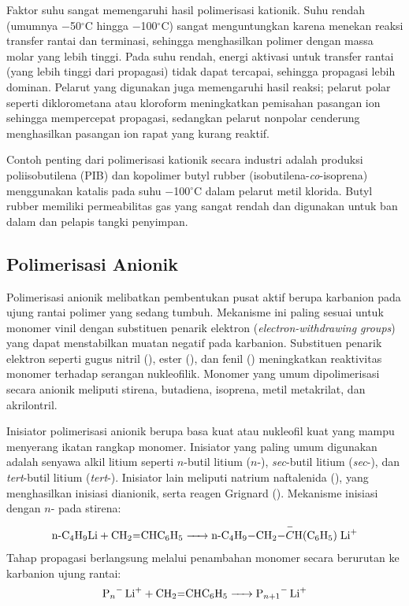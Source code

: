 \documentclass[12pt,a4paper,openany]{book}
\begin{document}
Faktor suhu sangat memengaruhi hasil polimerisasi kationik. Suhu rendah (umumnya $-$50$^\circ$C hingga $-$100$^\circ$C) sangat menguntungkan karena menekan reaksi transfer rantai dan terminasi, sehingga menghasilkan polimer dengan massa molar yang lebih tinggi. Pada suhu rendah, energi aktivasi untuk transfer rantai (yang lebih tinggi dari propagasi) tidak dapat tercapai, sehingga propagasi lebih dominan. Pelarut yang digunakan juga memengaruhi hasil reaksi; pelarut polar seperti diklorometana atau kloroform meningkatkan pemisahan pasangan ion sehingga mempercepat propagasi, sedangkan pelarut nonpolar cenderung menghasilkan pasangan ion rapat yang kurang reaktif.

Contoh penting dari polimerisasi kationik secara industri adalah produksi poliisobutilena (PIB) dan kopolimer butyl rubber (isobutilena-\textit{co}-isoprena) menggunakan katalis  pada suhu $-$100$^\circ$C dalam pelarut metil klorida. Butyl rubber memiliki permeabilitas gas yang sangat rendah dan digunakan untuk ban dalam dan pelapis tangki penyimpan.

\subsection{Polimerisasi Anionik}

Polimerisasi anionik melibatkan pembentukan pusat aktif berupa karbanion pada ujung rantai polimer yang sedang tumbuh. Mekanisme ini paling sesuai untuk monomer vinil dengan substituen penarik elektron (\textit{electron-withdrawing groups}) yang dapat menstabilkan muatan negatif pada karbanion. Substituen penarik elektron seperti gugus nitril (), ester (), dan fenil () meningkatkan reaktivitas monomer terhadap serangan nukleofilik. Monomer yang umum dipolimerisasi secara anionik meliputi stirena, butadiena, isoprena, metil metakrilat, dan akrilontril.

Inisiator polimerisasi anionik berupa basa kuat atau nukleofil kuat yang mampu menyerang ikatan rangkap  monomer. Inisiator yang paling umum digunakan adalah senyawa alkil litium seperti $n$-butil litium ($n$-), \textit{sec}-butil litium (\textit{sec}-), dan \textit{tert}-butil litium (\textit{tert}-). Inisiator lain meliputi natrium naftalenida (), yang menghasilkan inisiasi dianionik, serta reagen Grignard (). Mekanisme inisiasi dengan $n$- pada stirena:
\begin{equation}
  \ce{n-C4H9Li + CH2=CHC6H5 -> n-C4H9-CH2-\overset{-}{C}H(C6H5)\;Li^+}
\end{equation}
Tahap propagasi berlangsung melalui penambahan monomer secara berurutan ke karbanion ujung rantai:
\begin{equation}
  \ce{P_n^- Li^+ + CH2=CHC6H5 -> P_{n+1}^- Li^+}
\end{equation}
\end{document}
